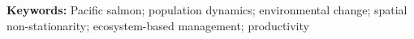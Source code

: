 \newline



\noindent \textbf{Keywords:} Pacific salmon; population dynamics; environmental
change; spatial non-stationarity; ecosystem-based management; productivity

